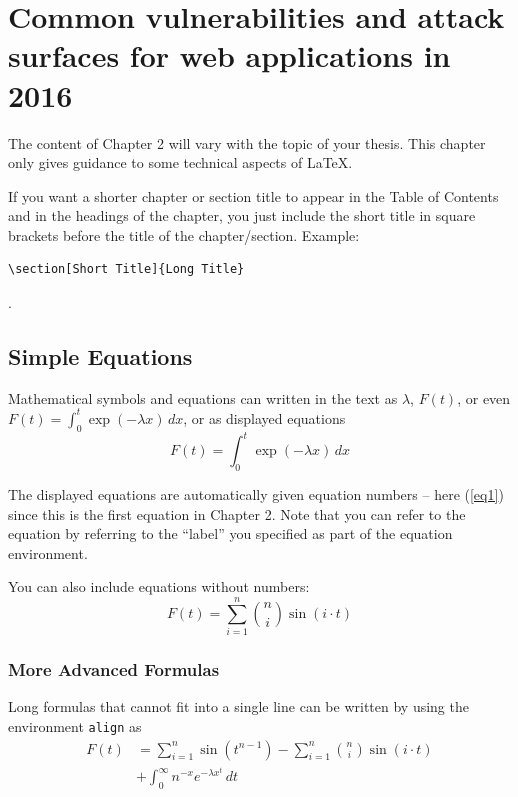 \chapter[Common Vulnerabilities, etc]{Common vulnerabilities and attack surfaces for web applications in 2016}
The content of Chapter 2 will vary with the topic of your thesis. This chapter only gives guidance to some technical aspects of \LaTeX.
 
\begin{remark}
If you want a shorter chapter or section title to appear in the Table of Contents and in the headings of the chapter, you just include the short title in square brackets before the title of the chapter/section. Example: \begin{verbatim}\section[Short Title]{Long Title}\end{verbatim}.
\end{remark}

\section{Simple Equations}
Mathematical symbols and equations can written in the text as $\lambda$, $F(t)$, or even $F(t)=\int_0^t \exp(-\lambda x)\,dx$, or as displayed equations
\begin{equation}
F(t)=\int_0^t \exp(-\lambda x)\,dx
\label{eq1}
\end{equation}


The displayed equations are automatically given equation numbers -- here (\ref{eq1}) since this is the first equation in Chapter 2. Note that you can refer to the equation by referring to the ``label'' you specified as part of the equation environment.

You can also include equations without numbers:
\begin{equation*}
F(t)=\sum_{i=1}^n \binom{n}{i}\sin(i\cdot t)
\end{equation*}

\subsection*{More Advanced Formulas}
Long formulas that cannot fit into a single line can be written by using the environment \texttt{align} as
\begin{align}
F(t)&= \sum_{i=1}^n \sin(t^{n-1}) - \sum_{i=1}^n \binom{n}{i}\sin(i\cdot t) \\
      & + \int_0^\infty n^{-x} e^{-\lambda x^t}\,dt
\end{align}

